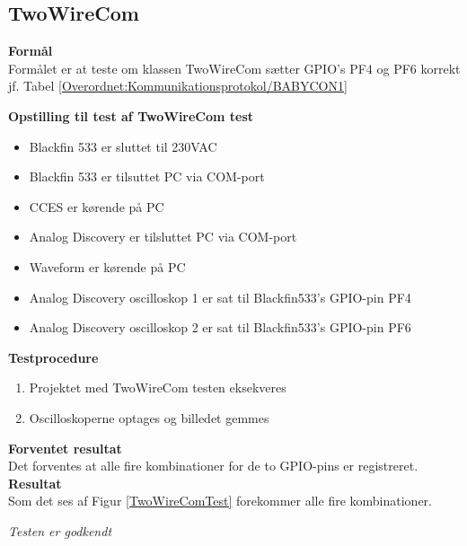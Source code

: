 \subsection*{TwoWireCom}
\textbf{Formål} \\
Formålet er at teste om klassen TwoWireCom sætter GPIO's PF4 og PF6 korrekt jf. Tabel \ref{Overordnet:Kommunikationsprotokol/BABYCON1}

\textbf{Opstilling til test af TwoWireCom test}

\begin{itemize}
	\item Blackfin 533 er sluttet til 230VAC
	\item Blackfin 533 er tilsuttet PC via COM-port
	\item CCES er kørende på PC
	\item Analog Discovery er tilsluttet PC via COM-port
	\item Waveform er kørende på PC
	\item Analog Discovery oscilloskop 1 er sat til Blackfin533's GPIO-pin PF4
	\item Analog Discovery oscilloskop 2 er sat til Blackfin533's GPIO-pin PF6
\end{itemize}

\textbf{Testprocedure}
\begin{enumerate}
	\item Projektet med TwoWireCom testen eksekveres 
	\item Oscilloskoperne optages og billedet gemmes
\end{enumerate}

\textbf{Forventet resultat} \\
Det forventes at alle fire kombinationer for de to GPIO-pins er registreret.  \\
\textbf{Resultat} \\
Som det ses af Figur \ref{TwoWireComTest} forekommer alle fire kombinationer. \\


\textit{Testen er godkendt}


